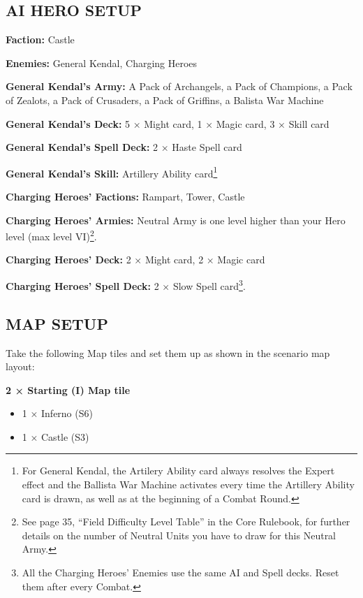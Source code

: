 \begin{multicols*}{2}
\subsection*{\MakeUppercase{AI hero setup}}

\textbf{Faction:} Castle

\textbf{Enemies:} General Kendal, Charging Heroes

\textbf{General Kendal's Army:} A Pack of Archangels, a Pack of Champions, a Pack of Zealots, a Pack of Crusaders, a Pack of Griffins, a Balista War Machine

\textbf{General Kendal's Deck:} 5 × Might card, 1 × Magic card, 3 × Skill card

\textbf{General Kendal's Spell Deck:} 2 × Haste Spell card

\textbf{General Kendal's Skill:} Artillery Ability card\footnote{For General Kendal, the Artilery Ability card always resolves the Expert effect and the Ballista War Machine activates every time the Artillery Ability card is drawn, as well as at the beginning of a Combat Round.}

\textbf{Charging Heroes' Factions:} Rampart, Tower, Castle

\textbf{Charging Heroes' Armies:} Neutral Army is one level higher than your Hero level (max level VI)\footnote{See page 35, ``Field Difficulty Level Table'' in the Core Rulebook, for further details on the number of Neutral Units you have to draw for this Neutral Army.}.

\textbf{Charging Heroes' Deck:} 2 × Might card, 2 × Magic card

\textbf{Charging Heroes' Spell Deck:} 2 × Slow Spell card\footnote{All the Charging Heroes' Enemies use the same AI and Spell decks. Reset them after every Combat.}.

\vspace*{\fill}\columnbreak

\subsection*{\MakeUppercase{Map setup}}

Take the following Map tiles and set them up as shown in the scenario map layout:

\textbf{2 × Starting (I) Map tile}
\begin{itemize}
  \item 1 × Inferno (S6)
  \item 1 × Castle (S3)
\end{itemize}


\end{multicols*}
